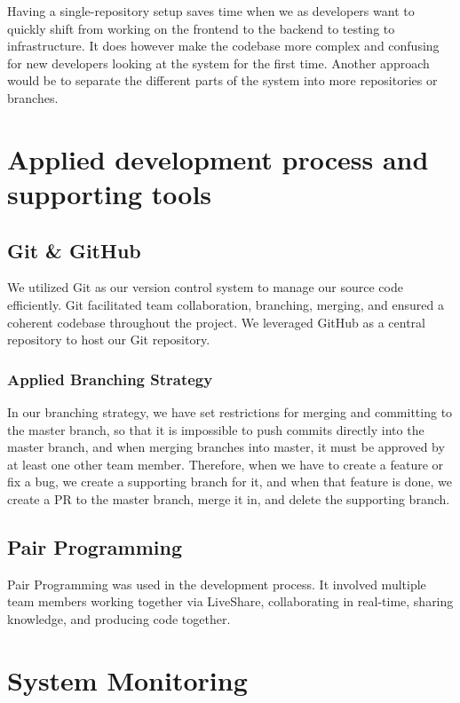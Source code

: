 Having a single-repository setup saves time when we as developers want to quickly shift from working on the frontend to the backend to testing to infrastructure. It does however make the codebase more complex and confusing for new developers looking at the system for the first time. Another approach would be to separate the different parts of the system into more repositories or branches.


\section{Applied development process and supporting tools}

\subsection{Git \& GitHub}

We utilized Git as our version control system to manage our source code efficiently. Git facilitated team collaboration, branching, merging, and ensured a coherent codebase throughout the project. We leveraged GitHub as a central repository to host our Git repository.

\subsubsection{Applied Branching Strategy}
In our branching strategy, we have set restrictions for merging and committing to the master branch, so that it is impossible to push commits directly into the master branch, and when merging branches into master, it must be approved by at least one other team member. Therefore, when we have to create a feature or fix a bug, we create a supporting branch for it, and when that feature is done, we create a \gls{PR} to the master branch, merge it in, and delete the supporting branch.

\subsection{Pair Programming}
Pair Programming was used in the development process. It involved multiple team members working together via LiveShare, collaborating in real-time, sharing knowledge, and producing code together.


\section{System Monitoring}

